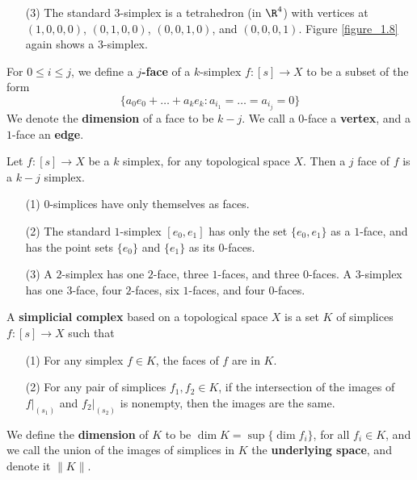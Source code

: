 \begin{example}
\begin{enumerate}
        \item[(3)] The standard $3$-simplex is a tetrahedron  (in $\R^4$) with
            vertices at $(1,0,0,0)$, $(0,1,0,0)$, $(0,0,1,0)$, and $(0,0,0,1)$.
            Figure \ref{figure_1.8} again shows a $3$-simplex.
    \end{enumerate}
\end{example}

\begin{definition}
    For $0 \leq i \leq j$, we define a \textbf{$j$-face} of a $k$-simplex
     $f:[s] \xrightarrow{} X$ to be a subset of the form
     \begin{equation*}
         \{a_0e_0+\dots+a_ke_k : a_{i_1}=\dots=a_{i_j}=0\}
     \end{equation*}
     We denote the \textbf{dimension} of a face to be  $k-j$. We call a
     $0$-face a  \textbf{vertex}, and a $1$-face an  \textbf{edge}.
\end{definition}

\begin{lemma}\label{1.4.1}
    Let $f:[s] \xrightarrow{} X$ be a $k$ simplex, for any topological space
    $X$. Then a  $j$ face of $f$ is a $k-j$ simplex.
\end{lemma}

\begin{example}\label{example_1.13}
    \begin{enumerate}
        \item[(1)] $0$-simplices have only themselves as faces.

        \item[(2)] The standard $1$-simplex  $[e_0,e_1]$ has only the set
            $\{e_0,e_1\}$ as a $1$-face, and has the point sets  $\{e_0\}$
            and $\{e_1\}$ as its $0$-faces.

        \item[(3)] A $2$-simplex has one  $2$-face, three $1$-faces, and three
            $0$-faces. A $3$-simplex has one $3$-face, four $2$-faces, six
            $1$-faces, and four $0$-faces.
    \end{enumerate}
\end{example}

\begin{definition}
    A \textbf{simplicial complex} based on a topological space $X$ is a set  $K$
    of simplices  $f:[s] \xrightarrow{} X$ such that
    \begin{enumerate}
        \item[(1)] For any simplex $f \in K$, the faces of $f$ are in  $K$.

        \item[(2)] For any pair of simplices $f_1, f_2 \in K$, if the
            intersection of the images of $f|_{(s_1)}$ and $f_2|_{(s_2)}$ is
            nonempty, then the images are the same.
    \end{enumerate}
    We define the \textbf{dimension} of $K$ to be  $\dim{K}=\sup\{\dim{f_i}\}$,
    for all $f_i \in K$, and we call the union of the images of simplices in
    $K$ the  \textbf{underlying space}, and denote it $\|K\|$.
\end{definition}

